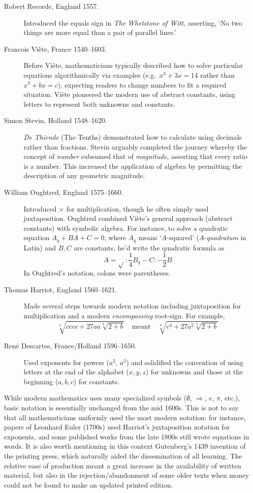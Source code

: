 \begin{description}
	\item[Robert Recorde, England 1557.] Introduced the equals sign in \emph{The Whetstone of Witt,}	asserting, `No two things are more equal than a pair of parallel lines.'
	
	\item[Francois Viète, France 1540--1603.] Before Viète, mathematicians typically described how to solve particular equations algorithmically via examples (e.g.\ $x^3+3x=14$ rather than $x^3+bx=c$), expecting readers to change numbers to fit a required situation. Viète pioneered the modern use of abstract constants, using letters to represent both unknowns and constants.
	
	\item[Simon Stevin, Holland 1548--1620.] \emph{De Thiende} (The Tenths) demonstrated how to calculate using decimals rather than fractions. Stevin arguably completed the journey whereby the concept of \emph{number} subsumed that of \emph{magnitude,} asserting that every ratio is a number. This increased the application of algebra by permitting the description of any geometric magnitude.
		
	\item[William Oughtred, England 1575--1660.] Introduced $\times$ for multiplication, though he often simply used juxtaposition. Oughtred combined Viète's general approach (abstract constants) with symbolic algebra. For instance, to solve a quadratic equation $A_q+BA+C=0$, where $A_q$ means `$A$-squared' ($A$-\emph{quadratum} in Latin) and $B,C$ are constants, he'd write the quadratic formula as
	\[
		A=\sqrt{} :\frac 14B_q-C:-\frac 12B
	\]
	In Oughtred's notation, colons were parentheses.
	
	\item[Thomas Harriot, England 1560--1621.] Made several steps towards modern notation including juxtaposition for multiplication and a modern \emph{encompassing} root-sign. For example, 
	\[
		\sqrt[4]{cccc+27aa\sqrt[3]{2+b}}\quad\text{meant}\quad \sqrt[4]{c^4+27a^2\sqrt[3]{2+b}}
	\]
	
	\item[René Descartes, France/Holland 1596--1650.] Used exponents for powers ($a^2$, $a^3$) and solidified the convention of using letters at the end of the alphabet ($x,y,z$) for unknowns and those at the beginning ($a,b,c$) for constants.
\end{description}


While modern mathematics uses many specialized symbols ($\emptyset$, $\Rightarrow$, $e$, $\pi$, etc.), basic notation is essentially unchanged from the mid 1600s. This is not to say that all mathematicians uniformly used the most modern notation: for instance, papers of Leonhard Euler (1700s) used Harriot's juxtaposition notation for exponents, and some published works from the late 1800s still wrote equations in words.\smallbreak
It is also worth mentioning in this context Gutenberg's 1439 invention of the printing press, which naturally aided the dissemination of all learning. The relative ease of production meant a great increase in the availability of written material, but also in the rejection/abandonment of some older texts when money could not be found to make an updated printed edition.


